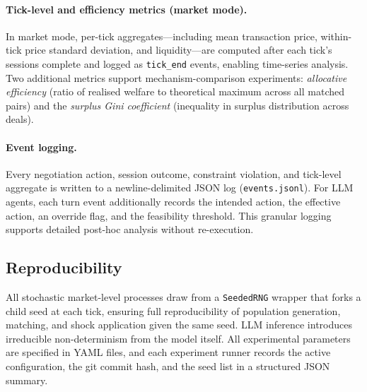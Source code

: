 \paragraph{Tick-level and efficiency metrics (market mode).}
In market mode, per-tick aggregates---including mean transaction price, within-tick price standard deviation, and liquidity---are computed after each tick's sessions complete and logged as \texttt{tick\_end} events, enabling time-series analysis.  Two additional metrics support mechanism-comparison experiments: \emph{allocative efficiency} (ratio of realised welfare to theoretical maximum across all matched pairs) and the \emph{surplus Gini coefficient} (inequality in surplus distribution across deals).

\paragraph{Event logging.}
Every negotiation action, session outcome, constraint violation, and tick-level aggregate is written to a newline-delimited JSON log (\texttt{events.jsonl}). For LLM agents, each turn event additionally records the intended action, the effective action, an override flag, and the feasibility threshold. This granular logging supports detailed post-hoc analysis without re-execution.

\subsection{Reproducibility}
\label{sec:reproducibility}

All stochastic market-level processes draw from a \texttt{SeededRNG} wrapper that forks a child seed at each tick, ensuring full reproducibility of population generation, matching, and shock application given the same seed.  LLM inference introduces irreducible non-determinism from the model itself.  All experimental parameters are specified in YAML files, and each experiment runner records the active configuration, the git commit hash, and the seed list in a structured JSON summary.
